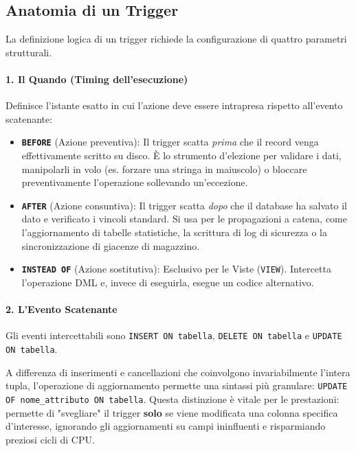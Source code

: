 \subsection{Anatomia di un Trigger}

La definizione logica di un trigger richiede la configurazione di quattro parametri strutturali.

\paragraph{1. Il Quando (Timing dell'esecuzione)}
Definisce l'istante esatto in cui l'azione deve essere intrapresa rispetto all'evento scatenante:
\begin{itemize}
    \item \textbf{\texttt{BEFORE}} (Azione preventiva): Il trigger scatta \textit{prima} che il record venga effettivamente scritto su disco. È lo strumento d'elezione per validare i dati, manipolarli in volo (es. forzare una stringa in maiuscolo) o bloccare preventivamente l'operazione sollevando un'eccezione.
    \item \textbf{\texttt{AFTER}} (Azione consuntiva): Il trigger scatta \textit{dopo} che il database ha salvato il dato e verificato i vincoli standard. Si usa per le propagazioni a catena, come l'aggiornamento di tabelle statistiche, la scrittura di log di sicurezza o la sincronizzazione di giacenze di magazzino.
    \item \textbf{\texttt{INSTEAD OF}} (Azione sostitutiva): Esclusivo per le Viste (\texttt{VIEW}). Intercetta l'operazione DML e, invece di eseguirla, esegue un codice alternativo.
\end{itemize}

\paragraph{2. L'Evento Scatenante}
Gli eventi intercettabili sono \texttt{INSERT ON tabella}, \texttt{DELETE ON tabella} e \texttt{UPDATE ON tabella}.

\begin{observation}
A differenza di inserimenti e cancellazioni che coinvolgono invariabilmente l'intera tupla, l'operazione di aggiornamento permette una sintassi più granulare: \texttt{UPDATE OF nome\_attributo ON tabella}. 
Questa distinzione è vitale per le prestazioni: permette di "svegliare" il trigger \textbf{solo} se viene modificata una colonna specifica d'interesse, ignorando gli aggiornamenti su campi ininfluenti e risparmiando preziosi cicli di CPU.
\end{observation}

